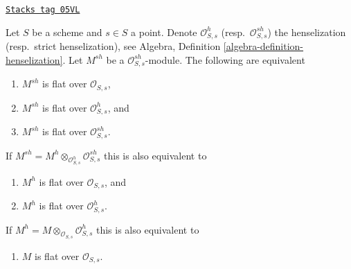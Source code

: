 \begin{lemma}
\label{flat-lemma-flat-up-down-henselization}
\href{https://stacks.math.columbia.edu/tag/05VL}{\texttt{Stacks tag 05VL}}

Let $S$ be a scheme and $s \in S$ a point. Denote $\mathcal{O}_{S, s}^h$
(resp.\ $\mathcal{O}_{S, s}^{sh}$) the henselization (resp.\ strict
henselization), see
Algebra, Definition \ref{algebra-definition-henselization}.
Let $M^{sh}$ be a $\mathcal{O}_{S, s}^{sh}$-module.
The following are equivalent
\begin{enumerate}
\item $M^{sh}$ is flat over $\mathcal{O}_{S, s}$,
\item $M^{sh}$ is flat over $\mathcal{O}_{S, s}^h$, and
\item $M^{sh}$ is flat over $\mathcal{O}_{S, s}^{sh}$.
\end{enumerate}
If $M^{sh} = M^h \otimes_{\mathcal{O}_{S, s}^h} \mathcal{O}_{S, s}^{sh}$
this is also equivalent to
\begin{enumerate}
\item[(4)] $M^h$ is flat over $\mathcal{O}_{S, s}$, and
\item[(5)] $M^h$ is flat over $\mathcal{O}_{S, s}^h$.
\end{enumerate}
If $M^h = M \otimes_{\mathcal{O}_{S, s}} \mathcal{O}_{S, s}^h$
this is also equivalent to
\begin{enumerate}
\item[(6)] $M$ is flat over $\mathcal{O}_{S, s}$.
\end{enumerate}
\end{lemma}

